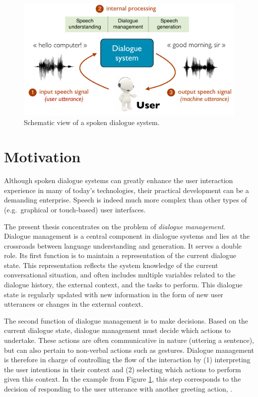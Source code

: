 \begin{figure}[ht]
\center
\includegraphics[scale=0.46]{imgs/basicsds.pdf}
\caption{Schematic view of a spoken dialogue system.}
\label{fig:basicsds}
\end{figure}

\section{Motivation}

Although spoken dialogue systems can greatly enhance the user interaction experience in many of today's technologies, their practical development can be a demanding enterprise. Speech is indeed much more complex than other types of (e.g.\ graphical or touch-based) user interfaces.

The present thesis concentrates on the problem of \textit{dialogue management}.  Dialogue management is a central component in dialogue systems and lies at the crossroads between language understanding and generation.  It serves a double role. Its first function is to maintain a representation of the current dialogue state. This representation reflects the system knowledge of the current conversational situation, and often includes multiple variables related to the dialogue history, the external context, and the tasks to perform.  This dialogue state is regularly updated with new information in the form of new user utterances or changes in the external context. 

The second function of dialogue management is to make decisions.  Based on the current dialogue state, dialogue management must decide which actions to undertake. These actions are often communicative in nature (uttering a sentence), but can also pertain to non-verbal actions such as gestures.  Dialogue management is therefore in charge of controlling the flow of the interaction by (1) interpreting the user intentions in their context and (2) selecting which actions to perform given this context. In the example from Figure \ref{fig:basicsds}, this step corresponds to the decision of responding to the user utterance  with another greeting action, . 


